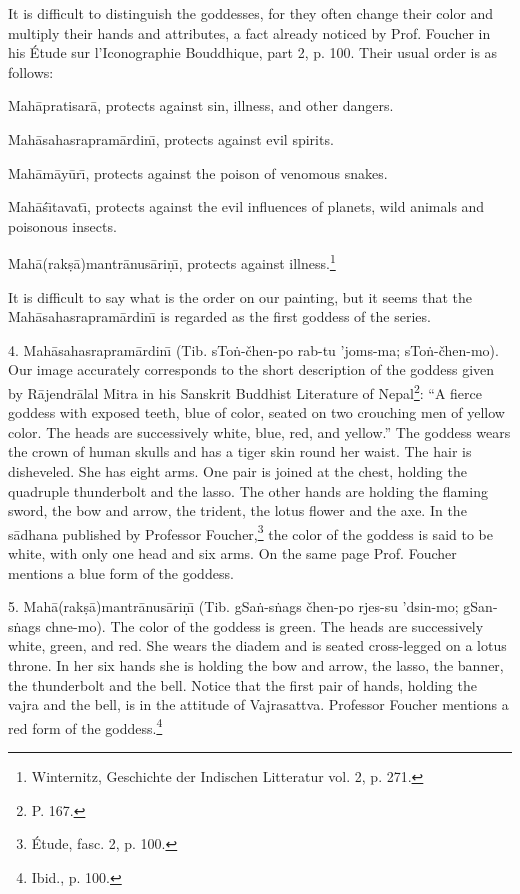 \documentclass[a4paper, 12pt, oneside]{article}
\begin{document}
It is difficult to distinguish the goddesses, for they often change their color and multiply their hands and attributes, a fact already noticed by Prof. Foucher in his Étude sur l'Iconographie Bouddhique, part 2, p. 100. Their usual order is as follows:

Mah\={a}pratisar\={a}, protects against sin, illness, and other dangers.

Mah\={a}sahasrapram\={a}rdin\={\i}, protects against evil spirits.

Mah\={a}m\={a}y\={u}r\={\i}, protects against the poison of venomous snakes.

Mah\={a}\'{s}\={\i}tavat\={\i}, protects against the evil influences of planets, wild animals and poisonous insects.

Mah\={a}(rak\d{s}\={a})mantr\={a}nus\={a}ri\d{n}\={\i}, protects against illness.\footnote{Winternitz, Geschichte der Indischen Litteratur vol. 2, p. 271.}

It is difficult to say what is the order on our painting, but it seems that the Mah\={a}sahasrapram\={a}rdin\={\i} is regarded as the first goddess of the series.

4. Mah\={a}sahasrapram\={a}rdin\={\i} (Tib. sTo\.{n}-čhen-po rab-tu 'joms-ma; sTo\.{n}-čhen-mo). Our image accurately corresponds to the short description of the goddess given by R\={a}jendr\={a}lal Mitra in his Sanskrit Buddhist Literature of Nepal\footnote{P. 167.}: ``A fierce goddess with exposed teeth, blue of color, seated on two crouching men of yellow color. The heads are successively white, blue, red, and yellow.'' The goddess wears the crown of human skulls and has a tiger skin round her waist. The hair is disheveled. She has eight arms. One pair is joined at the chest, holding the quadruple thunderbolt and the lasso. The other hands are holding the flaming sword, the bow and arrow, the trident, the lotus flower and the axe. In the s\={a}dhana published by Professor Foucher,\footnote{Étude, fasc. 2, p. 100.} the color of the goddess is said to be white, with only one head and six arms. On the same page Prof. Foucher mentions a blue form of the goddess.

5. Mah\={a}(rak\d{s}\={a})mantr\={a}nus\={a}ri\d{n}\={\i} (Tib. gSa\.{n}-s\.{n}ags čhen-po rjes-su 'dsin-mo; gSan-s\.{n}ags chne-mo). The color of the goddess is green. The heads are successively white, green, and red. She wears the diadem and is seated cross-legged on a lotus throne. In her six hands she is holding the bow and arrow, the lasso, the banner, the thunderbolt and the bell. Notice that the first pair of hands, holding the vajra and the bell, is in the attitude of Vajrasattva. Professor Foucher mentions a red form of the goddess.\footnote{Ibid., p. 100.}
\end{document}
